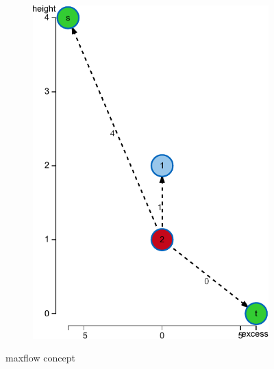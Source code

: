 \begin{figure}
\begin{subfigure}[t]{0.45\textwidth}
\includegraphics[width=\textwidth]{fig/maxflow-graph-algorithm-height}
\end{subfigure}
\caption{maxflow concept}
\label{fig:maxflow}
\end{figure}





